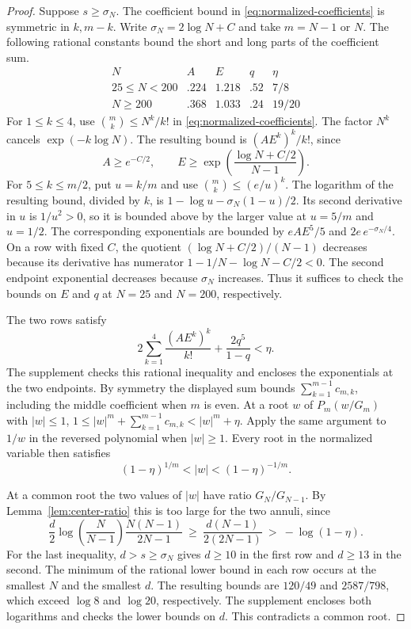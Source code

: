 \begin{proof}
Suppose \(s\ge\sigma_N\). The coefficient bound in
\eqref{eq:normalized-coefficients} is symmetric in \(k,m-k\).
Write \(\sigma_N=2\log N+C\) and take \(m=N-1\) or \(N\).
The following rational constants bound the short and long parts
of the coefficient sum.
\[
\begin{array}{c|cccc}
 N&A&E&q&\eta\\ \hline
 25\le N<200&.224&1.218&.52&7/8\\
 N\ge200&.368&1.033&.24&19/20
\end{array}
\]
For \(1\le k\le4\), use \(\binom mk\le N^k/k!\) in
\eqref{eq:normalized-coefficients}. The factor \(N^k\) cancels
\(\exp(-k\log N)\). The resulting bound is \((AE^k)^k/k!\), since
\[
 A\ge e^{-C/2},\qquad
 E\ge \exp\!\left(\frac{\log N+C/2}{N-1}\right).
\]
For \(5\le k\le m/2\), put \(u=k/m\) and use
\(\binom mk\le(e/u)^k\). The logarithm of the resulting bound,
divided by \(k\), is \(1-\log u-\sigma_N(1-u)/2\).
Its second derivative in \(u\) is \(1/u^2>0\), so it is bounded
above by the larger value at \(u=5/m\) and \(u=1/2\).
The corresponding exponentials are bounded by \(eAE^5/5\)
and \(2e\,e^{-\sigma_N/4}\).
On a row with fixed \(C\), the quotient \((\log N+C/2)/(N-1)\)
decreases because its derivative has numerator
\(1-1/N-\log N-C/2<0\). The second endpoint exponential
decreases because \(\sigma_N\) increases.
Thus it suffices to check the bounds on \(E\) and \(q\) at
\(N=25\) and \(N=200\), respectively.

The two rows satisfy
\[
 2\sum_{k=1}^{4}\frac{(AE^k)^k}{k!}+\frac{2q^5}{1-q}<\eta .
\]
The supplement checks this rational inequality and encloses the
exponentials at the two endpoints. By symmetry the displayed
sum bounds \(\sum_{k=1}^{m-1}c_{m,k}\), including the middle
coefficient when \(m\) is even. At a root \(w\) of \(P_m(w/G_m)\) with \(|w|\le1\),
\(1\le |w|^m+\sum_{k=1}^{m-1}c_{m,k}<|w|^m+\eta\).
Apply the same argument to \(1/w\) in the reversed polynomial
when \(|w|\ge1\). Every root in the normalized variable then
satisfies
\[
 (1-\eta)^{1/m}<|w|<(1-\eta)^{-1/m}.
\]

At a common root the two values of \(|w|\) have ratio \(G_N/G_{N-1}\).
By Lemma~\ref{lem:center-ratio} this is too large for the two annuli, since
\[
 \frac d2\log\!\left(\frac N{N-1}\right)
              \frac{N(N-1)}{2N-1}
 \ \ge\ \frac{d(N-1)}{2(2N-1)}
 \ >\ -\log(1-\eta).
\]
For the last inequality, \(d>s\ge\sigma_N\) gives \(d\ge10\)
in the first row and \(d\ge13\) in the second. The minimum
of the rational lower bound in each row occurs at the smallest
\(N\) and the smallest \(d\). The resulting bounds are \(120/49\)
and \(2587/798\), which exceed \(\log 8\) and \(\log 20\),
respectively. The supplement encloses both logarithms and
checks the lower bounds on \(d\). This contradicts a common root.
\end{proof}


